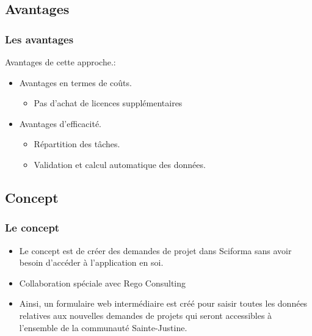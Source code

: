 \documentclass[aspectratio=169]{beamer}%
\let\note\relax
\begin{document}
\subsection{Avantages}
\begin{frame}
\transwipe 
\frametitle{Les avantages}
Avantages de cette approche.:
\begin{itemize}%
	\item Avantages en termes de coûts.
		\begin{itemize}
		\item Pas d'achat de licences supplémentaires
		\end{itemize}
	\item Avantages d'efficacité.
		\begin{itemize}
		\item Répartition des tâches.
		\item Validation et calcul automatique des données.
		\end{itemize}
\end{itemize}	
\end{frame}


\subsection{Concept}
\begin{frame}
\transwipe 
\frametitle{Le concept}
\begin{itemize}%

	\item Le concept est de créer des demandes de projet dans Sciforma sans avoir besoin d'accéder à l'application en soi.
	\item Collaboration spéciale avec Rego Consulting 
	\item Ainsi, un formulaire web intermédiaire est créé pour saisir toutes les données relatives aux nouvelles demandes de projets qui seront accessibles à l'ensemble de la communauté Sainte-Justine.
\end{itemize}
\end{frame}
\end{document}
